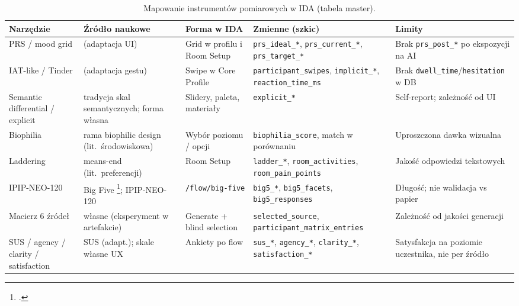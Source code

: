 \begin{table}[htbp]
  \centering
  \small
  \caption{Mapowanie instrumentów pomiarowych w IDA (tabela master).}
  \label{tab:ch06:instruments}
  \begin{tabular}{@{}p{2.2cm}p{2.6cm}p{3.0cm}p{2.8cm}p{2.8cm}@{}}
    \toprule
    Narzędzie & Źródło naukowe & Forma w IDA & Zmienne (szkic) & Limity \\
    \midrule
    PRS / mood grid &
      \textcite{hartig1997prs} (adaptacja UI) &
      Grid w profilu i Room Setup &
      \texttt{prs\_ideal\_*}, \texttt{prs\_current\_*}, \texttt{prs\_target\_*} &
      Brak \texttt{prs\_post\_*} po ekspozycji na AI \\
    \addlinespace
    IAT-like / Tinder &
      \textcite{greenwald1998iat} (adaptacja gestu) &
      Swipe w Core Profile &
      \texttt{participant\_swipes}, \texttt{implicit\_*}, \texttt{reaction\_time\_ms} &
      Brak \texttt{dwell\_time}/\texttt{hesitation} w DB \\
    \addlinespace
    Semantic differential / explicit &
      tradycja skal semantycznych; forma własna &
      Slidery, paleta, materiały &
      \texttt{explicit\_*} &
      Self-report; zależność od UI \\
    \addlinespace
    Biophilia &
      rama biophilic design (lit.\ środowiskowa) &
      Wybór poziomu / opcji &
      \texttt{biophilia\_score}, match w porównaniu &
      Uproszczona dawka wizualna \\
    \addlinespace
    Laddering &
      means-end (lit.\ preferencji) &
      Room Setup &
      \texttt{ladder\_*}, \texttt{room\_activities}, \texttt{room\_pain\_points} &
      Jakość odpowiedzi tekstowych \\
    \addlinespace
    IPIP-NEO-120 &
      Big Five \footcite{john2008bigfive}; IPIP-NEO-120 &
      \texttt{/flow/big-five} &
      \texttt{big5\_*}, \texttt{big5\_facets}, \texttt{big5\_responses} &
      Długość; nie walidacja vs papier \\
    \addlinespace
    Macierz 6 źródeł &
      własne (eksperyment w artefakcie) &
      Generate + blind selection &
      \texttt{selected\_source}, \texttt{participant\_matrix\_entries} &
      Zależność od jakości generacji \\
    \addlinespace
    SUS / agency / clarity / satisfaction &
      SUS (adapt.); skale własne UX &
      Ankiety po flow &
      \texttt{sus\_*}, \texttt{agency\_*}, \texttt{clarity\_*}, \texttt{satisfaction\_*} &
      Satysfakcja na poziomie uczestnika, nie per źródło \\
    \bottomrule
  \end{tabular}
\end{table}


